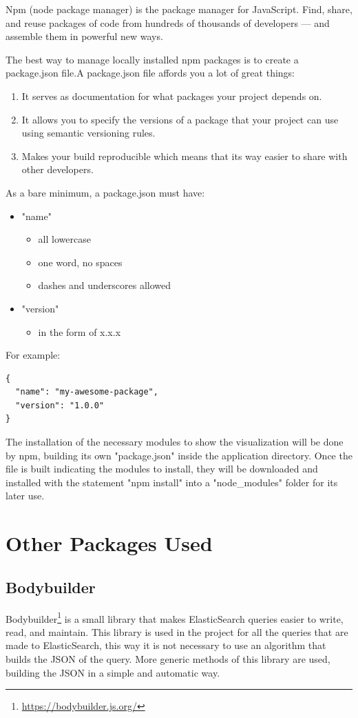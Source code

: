 \documentclass[a4paper, 12pt]{book}
\begin{document}
Npm (node package manager) is the package manager for JavaScript. Find, share, and reuse packages of code from hundreds of thousands of developers — and assemble them in powerful new ways. 

The best way to manage locally installed npm packages is to create a package.json file.A package.json file affords you a lot of great things:
\begin{enumerate}
\item It serves as documentation for what packages your project depends on.
\item It allows you to specify the versions of a package that your project can use using semantic versioning rules.
\item Makes your build reproducible which means that its way easier to share with other developers.
\end{enumerate}

As a bare minimum, a package.json must have:
\begin{itemize}
\item "name"
\begin{itemize}
\item all lowercase
\item one word, no spaces
\item dashes and underscores allowed
\end{itemize}
\item "version"
\begin{itemize}
\item in the form of x.x.x
\end{itemize}
\end{itemize}

For example:
\begin{lstlisting}[frame=single]
{
  "name": "my-awesome-package",
  "version": "1.0.0"
}
\end{lstlisting}

The installation of the necessary modules to show the visualization will be done by npm, building its own "package.json" inside the application directory.  Once the file is built indicating the modules to install, they will be downloaded and installed with the statement "npm install" into a "node\_modules" folder for its later use.

\section{Other Packages Used}
\label{sec:otherspackage}
\subsection{Bodybuilder}
Bodybuilder\footnote{\url{https://bodybuilder.js.org/}} is a small library that makes ElasticSearch queries easier to write, read, and maintain. This library is used in the project for all the queries that are made to ElasticSearch, this way it is not necessary to use an algorithm that builds the JSON of the query. More generic methods of this library are used, building the JSON in a simple and automatic way.
\end{document}
